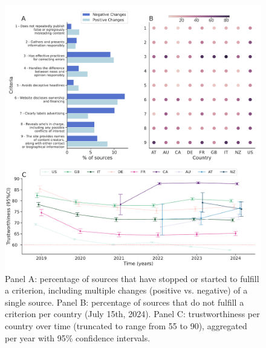\documentclass{article}
\begin{document}
\begin{figure}[H]
    \centering
    \includegraphics[width=\textwidth]{figures/criteria_panel_cropped.pdf}
    \caption{Panel A: percentage of sources that have stopped or started to fulfill a criterion, including multiple changes (positive vs. negative) of a single source. Panel B: percentage of sources that do not fulfill a criterion per country (July 15th, 2024). Panel C: trustworthiness per country over time (truncated to range from 55 to 90), aggregated per year with 95\% confidence intervals.}
    \label{fig:criteria_panel}
\end{figure}
\end{document}
